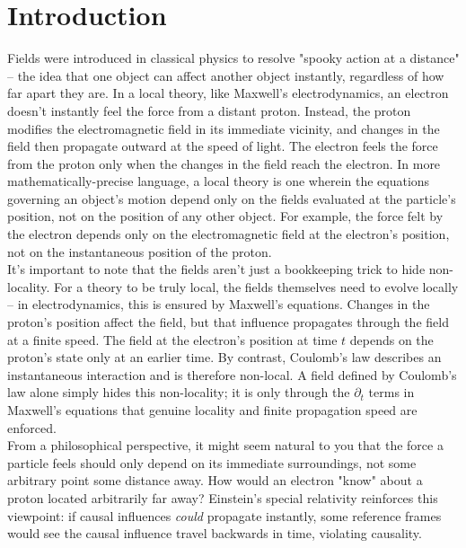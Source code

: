 \section{Introduction}
Fields were introduced in classical physics to resolve "spooky action at a distance" -- the idea that one object can affect another object instantly, regardless of how far apart they are. In a local theory, like Maxwell's electrodynamics, an electron doesn't instantly feel the force from a distant proton. Instead, the proton modifies the electromagnetic field in its immediate vicinity, and changes in the field then propagate outward at the speed of light. The electron feels the force from the proton only when the changes in the field reach the electron. In more mathematically-precise language, a local theory is one wherein the equations governing an object's motion depend only on the fields evaluated at the particle's position, not on the position of any other object. For example, the force felt by the electron depends only on the electromagnetic field at the electron's position, not on the instantaneous position of the proton. \\

\noindent It's important to note that the fields aren't just a bookkeeping trick to hide non-locality. For a theory to be truly local, the fields themselves need to evolve locally -- in electrodynamics, this is ensured by Maxwell's equations. Changes in the proton's position affect the field, but that influence propagates through the field at a finite speed. The field at the electron's position at time $t$ depends on the proton's state only at an earlier time. By contrast, Coulomb's law describes an instantaneous interaction and is therefore non-local. A field defined by Coulomb's law alone simply hides this non-locality; it is only through the $\partial_t$ terms in Maxwell's equations that genuine locality and finite propagation speed are enforced. \\

\noindent From a philosophical perspective, it might seem natural to you that the force a particle feels should only depend on its immediate surroundings, not some arbitrary point some distance away. How would an electron "know" about a proton located arbitrarily far away? Einstein's special relativity reinforces this viewpoint: if causal influences \textit{could} propagate instantly, some reference frames would see the causal influence travel backwards in time, violating causality.\\

